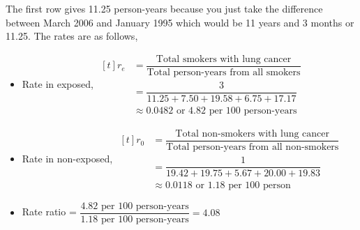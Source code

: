 \documentclass{article}
\begin{document}
The first row gives 11.25 person-years because you just take the difference between March 2006 and January 1995 which would be 11 years and 3 months or 11.25. The rates are as follows,
\begin{itemize}
    \item Rate in exposed, 
        $\!\begin{aligned}[t]
            r_e &= \dfrac{\text{Total smokers with lung cancer}}{\text{Total person-years from all smokers}} \\[1.5ex]
                &= \dfrac{3}{11.25 + 7.50 + 19.58 + 6.75 + 17.17} \\[1.5ex]
                &\approx 0.0482 \text{ or 4.82 per 100 person-years}
        \end{aligned}$ 
    \item Rate in non-exposed,
        $\!\begin{aligned}[t]
            r_0 &= \dfrac{\text{Total non-smokers with lung cancer}}{\text{Total person-years from all non-smokers}} \\[1.5ex]
                &= \dfrac{1}{19.42 + 19.75 + 5.67 + 20.00 + 19.83} \\[1.5ex]
                &\approx 0.0118 \text{ or 1.18 per 100 person}
        \end{aligned}$ 
    \item Rate ratio = $\dfrac{4.82 \text{ per 100 person-years}}{1.18 \text{ per 100 person-years}} = 4.08$
\end{itemize}
\end{document}
